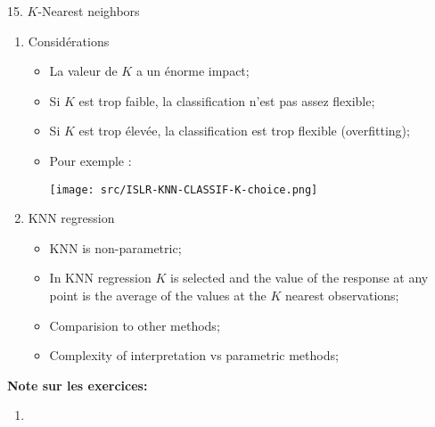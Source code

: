 \documentclass[12pt, titlepage, french]{report}
\begin{document}
\begin{CHPT_SUMM}[label = {PCA-KNN}]{15. $K$-Nearest neighbors}
\begin{enumerate}
\begin{enumerate}
		\item[]	C'est-à-dire, la valeur la plus présente dans les $K$ points les plus près
		\end{enumerate}
	\item[]	Considérations
		\begin{itemize}
		\item	La valeur de $K$ a un énorme impact;
		\item[]	Si $K$ est trop faible, la classification n'est pas assez flexible;
		\item[]	Si $K$ est trop élevée, la classification est trop flexible (overfitting);
		\item	Pour exemple :
		
		\texttt{[image: src/ISLR-KNN-CLASSIF-K-choice.png]}
		\end{itemize}
	\item	KNN regression
	\begin{itemize}
		\item	KNN is non-parametric;
		\item	In KNN regression $K$ is selected and the value of the response at any point is the average of the values at the $K$ nearest observations;
		\item	Comparision to other methods;
		\item	Complexity of interpretation vs parametric methods;
	\end{itemize}
\end{enumerate}
\textbf{Note sur les exercices:} 
\begin{enumerate}
	\item	
\end{enumerate}
\end{CHPT_SUMM}
\end{document}
